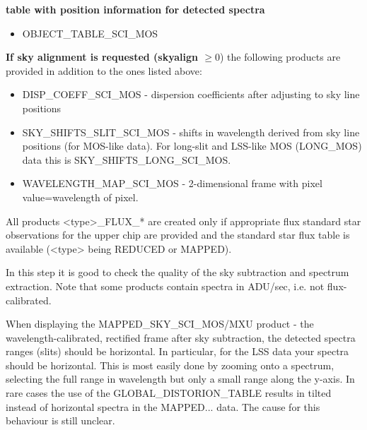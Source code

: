 {\bf table with position information for detected spectra} 
\begin{itemize}
\item OBJECT\_TABLE\_SCI\_MOS
\end{itemize}


{\bf If sky alignment is requested (skyalign $\geq 0$}) the following products are provided in addition to the ones listed above:

\begin{itemize}
\item DISP\_COEFF\_SCI\_MOS - dispersion coefficients after adjusting to sky line positions
\item SKY\_SHIFTS\_SLIT\_SCI\_MOS - shifts in wavelength derived from sky line positions (for MOS-like data). For long-slit and LSS-like MOS (LONG\_MOS) data this is SKY\_SHIFTS\_LONG\_SCI\_MOS.
\item WAVELENGTH\_MAP\_SCI\_MOS - 2-dimensional frame with pixel value=wavelength of pixel.
\end{itemize}

All products <type>\_FLUX\_* are created only if appropriate flux standard star observations for the upper chip are provided and the standard star flux table is available (<type> being REDUCED or MAPPED).

In this step it is good to check the quality of the sky subtraction and
spectrum extraction. Note that some products contain spectra in ADU/sec, i.e. not flux-calibrated. 

When displaying the MAPPED\_SKY\_SCI\_MOS/MXU product - the wavelength-calibrated, rectified frame after sky subtraction, the detected spectra ranges (slits) should be horizontal. In particular, for the LSS data your spectra should be horizontal. This is most easily done by zooming onto a spectrum, selecting the full range in wavelength but only a
small range along the y-axis. In rare cases the use of the GLOBAL\_DISTORION\_TABLE results in tilted instead of horizontal spectra
in the MAPPED... data. The cause for this behaviour is still unclear.

